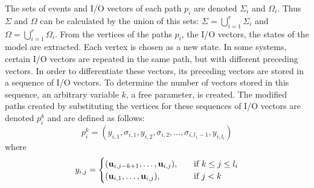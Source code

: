 The sets of events and I\slash O vectors of each path $p_i$ are denoted $\Sigma_i$
and $\Omega_i$. Thus $\Sigma$ and $\Omega$ can be calculated by the union of
this sets: $\Sigma=\bigcup_{i=1}^r\Sigma_i$ and
$\Omega=\bigcup_{i=1}^r\Omega_i$.
From the vertices of the paths $p_i$, the I\slash O vectors, the states of the model are extracted.
Each vertex is chosen as a new state.
In some systems, certain I\slash O vectors are repeated in the same path, but with different preceding vectors.
In order to differentiate these vectors, its preceding vectors are stored in a sequence of I\slash O vectors.
To determine the number of vectors stored in this sequence, an arbitrary variable $k$, a free parameter, is created. 
The modified paths created by substituting the vertices for these sequences of I\slash O vectors are denoted $p_i^k$ and are defined as follows:
\begin{equation}
  \label{eq:modifiedPath}
 p_i^k= (y_{i,1},\sigma_{i,1},y_{i,2},\sigma_{i,2},\dots,\sigma_{i,l_1-1},y_{i,l_i}) 
\end{equation}
where 
\begin{equation}
  \label{eq:modifiedPathb}
y_{i,j}=\begin{cases}
    (\mathbf{u}_{i,j-k+1},\dots,\mathbf{u}_{i,j}),& \quad \text{if } k\leq j\leq l_i\\
    (\mathbf{u}_{i,1},\dots,\mathbf{u}_{i,j}),  & \quad \text{if } j<k
  \end{cases}
\end{equation}


